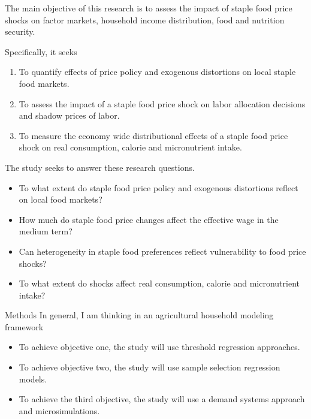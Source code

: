 \documentclass{beamer}
\begin{document}
  \begin{frame}
  The main objective of this research is to assess the impact of staple food price shocks on factor markets, household income distribution, food and nutrition security. 
  
Specifically, it seeks 
  	\begin{enumerate}
  		\item <1-| alert@1> To quantify effects of price policy and exogenous distortions on local staple food markets. 
  		\item <2-| alert@2> To assess the impact of a staple food price shock on labor allocation decisions and shadow prices of labor.
  		\item <3-| alert@3>To measure the economy wide distributional effects of a staple food price shock on real consumption, calorie and micronutrient intake.  
  	\end{enumerate}
  
  \end{frame}
  
  \begin{frame}
  The study seeks to answer  these research questions.
  \begin{itemize}
  \item <1-| alert@1> To what extent do staple food price policy and exogenous distortions reflect on local food markets?
  \item <2-| alert@2> How much do staple food price changes affect the effective wage in the medium term?
\item	<3-| alert@3> Can heterogeneity in staple food preferences reflect vulnerability to food price shocks? 
\item  <4-| alert@4> To what extent do shocks affect real consumption, calorie and micronutrient intake?  
  \end{itemize}
  \end{frame}
  
\begin{frame}{Methods}
In general, I am thinking in an agricultural household modeling framework
\begin{itemize}
\item To achieve objective one, the study will use threshold regression approaches.
\item To achieve objective two, the study will use sample selection regression models.
\item To achieve the third objective, the study will use a demand systems approach and microsimulations.
\end{itemize}
\end{frame}
\end{document}
